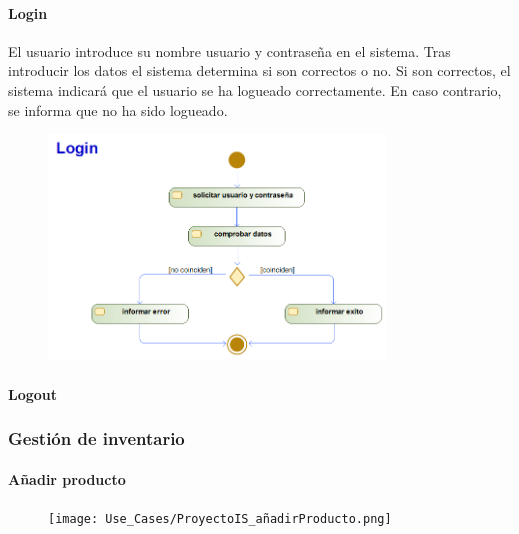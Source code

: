 \paragraph{Login}
El usuario introduce su nombre usuario y contraseña en el sistema. Tras introducir los datos el sistema determina si son correctos o no. Si son correctos, el sistema indicará que el usuario se ha logueado correctamente. En caso contrario, se informa que no ha sido logueado.
\begin{figure}[H]
    \centering
    \includegraphics[width=0.8\textwidth]{Use_Cases/login.png}
\end{figure}
\paragraph{Logout}
\subsubsection{Gestión de inventario}
\paragraph{Añadir producto}
\begin{figure}[H]
    \centering
    \texttt{[image: Use\_Cases/ProyectoIS\_añadirProducto.png]}
\end{figure}

